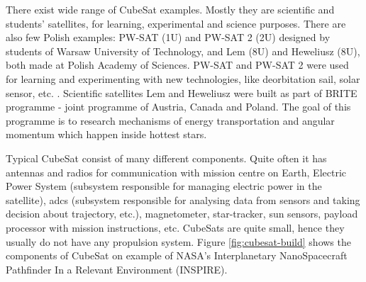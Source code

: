 \documentclass[12pt,a4paper,oneside]{article}
\begin{document}
There exist wide range of CubeSat examples. Mostly they are scientific and students' satellites, for learning, experimental and science purposes. There are also few Polish examples: PW-SAT (1U) and PW-SAT 2 (2U) designed by students of Warsaw University of Technology, and Lem (8U) and Heweliusz (8U), both made at Polish Academy of Sciences. PW-SAT and PW-SAT 2 were used for learning and experimenting with new technologies, like deorbitation sail, solar sensor, etc. \cite{pw-sat2}.
Scientific satellites Lem and Heweliusz were built as part of BRITE programme - joint programme of Austria, Canada and Poland. The goal of this programme is to research mechanisms of energy transportation and angular momentum which happen inside hottest stars\cite{brite-pl}.

Typical CubeSat consist of many different components. Quite often it has antennas and radios for communication with mission centre on Earth, Electric Power System (subsystem responsible for managing electric power in the satellite), \gls{adcs} (subsystem responsible for analysing data from sensors and taking decision about trajectory, etc.), magnetometer, star-tracker, sun sensors, payload processor with mission instructions, etc. CubeSats are quite small, hence they usually do not have any propulsion system\cite{lemmer2017propulsion}. Figure \ref{fig:cubesat-build} shows the components of CubeSat on example of NASA's Interplanetary NanoSpacecraft Pathfinder In a Relevant Environment (INSPIRE).
\end{document}
